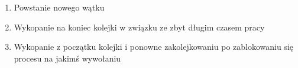\begin{enumerate}
    \item Powstanie nowego wątku
    \item Wykopanie na koniec kolejki w związku ze zbyt długim czasem pracy
    \item Wykopanie z początku kolejki i ponowne zakolejkowaniu po zablokowaniu się procesu na jakimś wywołaniu
\end{enumerate}